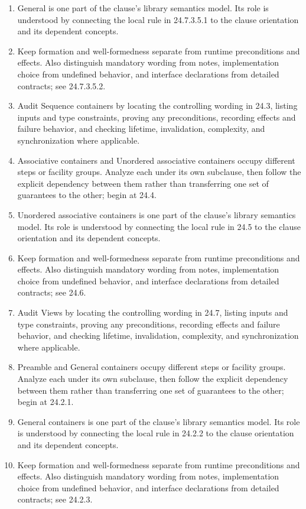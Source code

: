 \documentclass[11pt,letterpaper]{article}
\begin{document}
\begin{enumerate}
\item General is one part of the clause's library semantics model. Its role is understood by connecting the local rule in 24.7.3.5.1 to the clause orientation and its dependent concepts.
\item Keep formation and well-formedness separate from runtime preconditions and effects. Also distinguish mandatory wording from notes, implementation choice from undefined behavior, and interface declarations from detailed contracts; see 24.7.3.5.2.
\item Audit Sequence containers by locating the controlling wording in 24.3, listing inputs and type constraints, proving any preconditions, recording effects and failure behavior, and checking lifetime, invalidation, complexity, and synchronization where applicable.
\item Associative containers and Unordered associative containers occupy different steps or facility groups. Analyze each under its own subclause, then follow the explicit dependency between them rather than transferring one set of guarantees to the other; begin at 24.4.
\item Unordered associative containers is one part of the clause's library semantics model. Its role is understood by connecting the local rule in 24.5 to the clause orientation and its dependent concepts.
\item Keep formation and well-formedness separate from runtime preconditions and effects. Also distinguish mandatory wording from notes, implementation choice from undefined behavior, and interface declarations from detailed contracts; see 24.6.
\item Audit Views by locating the controlling wording in 24.7, listing inputs and type constraints, proving any preconditions, recording effects and failure behavior, and checking lifetime, invalidation, complexity, and synchronization where applicable.
\item Preamble and General containers occupy different steps or facility groups. Analyze each under its own subclause, then follow the explicit dependency between them rather than transferring one set of guarantees to the other; begin at 24.2.1.
\item General containers is one part of the clause's library semantics model. Its role is understood by connecting the local rule in 24.2.2 to the clause orientation and its dependent concepts.
\item Keep formation and well-formedness separate from runtime preconditions and effects. Also distinguish mandatory wording from notes, implementation choice from undefined behavior, and interface declarations from detailed contracts; see 24.2.3.

\end{enumerate}
\end{document}
